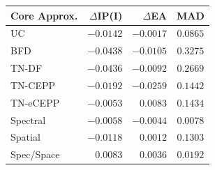 \begin{frame}
{\begin{columns}
\begin{column}{0.5\textwidth}
    \small
    \begin{tabular}{lrrc}
     \hline
     \hline
     Core Approx. & $\Delta$IP(I) & $\Delta$EA & MAD \\
     \hline
     UC          & $ -0.0142 $ & $ -0.0017 $ & $ 0.0865 $ \\  
     BFD         & $ -0.0438 $ & $ -0.0105 $ & $ 0.3275 $ \\ 
     TN-DF       & $ -0.0436 $ & $ -0.0092 $ & $ 0.2669 $ \\
     TN-CEPP     & $ -0.0192 $ & $ -0.0259 $ & $ 0.1442 $ \\
     TN-eCEPP    & $ -0.0053 $ & $  0.0083 $ & $ 0.1434 $ \\
     \hline
     Spectral    & $ -0.0058 $ & $ -0.0044 $ & $ 0.0078 $ \\
     Spatial     & $ -0.0118 $ & $  0.0012 $ & $ 0.1303 $ \\
     Spec/Space  & $  0.0083 $ & $  0.0036 $ & $ 0.0192 $ \\
     \hline
     \hline
    \end{tabular}
    \end{column}
    \begin{column}{0.5\textwidth}
      \begin{figure}
        \centering
        \vspace*{-0.05\textheight}
      \end{figure}
    \end{column}
  \end{columns}
  }
\end{frame}
